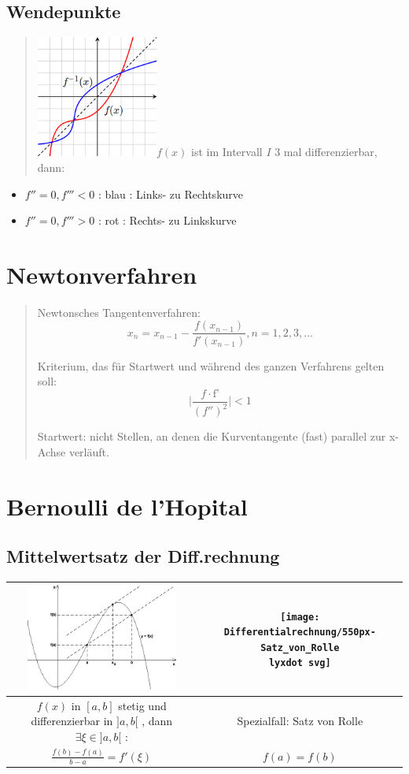 \subsection*{Wendepunkte}
\begin{quote}
\includegraphics[width=4cm]{Differentialrechnung/220px-Inverse_Function_Graph}$f(x)$
ist im Intervall $I$ 3 mal differenzierbar, dann:\end{quote}
\begin{itemize}
\item $f''=0,f'''<0$ : blau : Links- zu Rechtskurve
\item $f''=0,f'''>0$ : rot : Rechts- zu Linkskurve
\end{itemize}

\section*{Newtonverfahren}
\begin{quote}
Newtonsches Tangentenverfahren:
\[
x_{n}=x_{n-1}-\frac{f(x_{n-1})}{f'(x_{n-1})},n=1,2,3,...
\]


Kriterium, das für Startwert und während des ganzen Verfahrens gelten
soll:
\[
\mid\frac{f\cdot\text{f'}}{(f'')^{2}}\mid<1
\]


Startwert: nicht Stellen, an denen die Kurventangente (fast) parallel
zur x-Achse verläuft.
\end{quote}

\section*{Bernoulli de l'Hopital}


\subsection*{Mittelwertsatz der Diff.rechnung}

\begin{tabular}{|c|c|}
\hline 
\includegraphics[width=5cm]{Differentialrechnung/MittelwertsatzD} & \texttt{[image: Differentialrechnung/550px-Satz\_von\_Rolle\\lyxdot svg]}\tabularnewline
\hline 
\hline 
$f(x)$ in $[a,b]$ stetig und differenzierbar in $]a,b[$ , dann
$\exists\xi\in]a,b[$ : & Spezialfall: Satz von Rolle \tabularnewline
\hline 
$\frac{f(b)-f(a)}{b-a}=f'(\xi)$ & $f(a)=f(b)$\tabularnewline
\hline 
\end{tabular}


